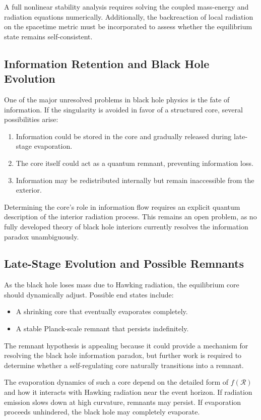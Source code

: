 A full nonlinear stability analysis requires solving the coupled mass-energy and radiation equations numerically. Additionally, the backreaction of local radiation on the spacetime metric must be incorporated to assess whether the equilibrium state remains self-consistent.

\subsection{Information Retention and Black Hole Evolution}
One of the major unresolved problems in black hole physics is the fate of information. If the singularity is avoided in favor of a structured core, several possibilities arise:
\begin{enumerate}
    \item Information could be stored in the core and gradually released during late-stage evaporation.
    \item The core itself could act as a quantum remnant, preventing information loss.
    \item Information may be redistributed internally but remain inaccessible from the exterior.
\end{enumerate}
Determining the core's role in information flow requires an explicit quantum description of the interior radiation process. This remains an open problem, as no fully developed theory of black hole interiors currently resolves the information paradox unambiguously.

\subsection{Late-Stage Evolution and Possible Remnants}
As the black hole loses mass due to Hawking radiation, the equilibrium core should dynamically adjust. Possible end states include:
\begin{itemize}
    \item A shrinking core that eventually evaporates completely.
    \item A stable Planck-scale remnant that persists indefinitely.
\end{itemize}
The remnant hypothesis is appealing because it could provide a mechanism for resolving the black hole information paradox, but further work is required to determine whether a self-regulating core naturally transitions into a remnant.

The evaporation dynamics of such a core depend on the detailed form of \( f(\mathcal{R}) \) and how it interacts with Hawking radiation near the event horizon. If radiation emission slows down at high curvature, remnants may persist. If evaporation proceeds unhindered, the black hole may completely evaporate.

